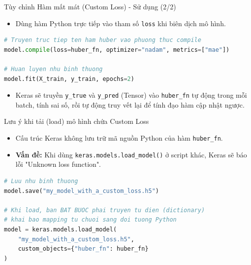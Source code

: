 \documentclass[aspectratio=169]{beamer}
\begin{document}
\begin{frame}[fragile]{Tùy chỉnh Hàm mất mát (Custom Loss) - Sử dụng (2/2)}
    \begin{itemize}
        \item Dùng hàm Python trực tiếp vào tham số \texttt{loss} khi biên dịch mô hình.
    \end{itemize}
    \begin{lstlisting}[language=Python]
# Truyen truc tiep ten ham huber vao phuong thuc compile
model.compile(loss=huber_fn, optimizer="nadam", metrics=["mae"])

# Huan luyen nhu binh thuong
model.fit(X_train, y_train, epochs=2)
    \end{lstlisting}
    \begin{itemize}
        \item Keras sẽ truyền \texttt{y\_true} và \texttt{y\_pred} (Tensor) vào \texttt{huber\_fn} tự động trong mỗi batch, tính sai số, rồi tự động truy vết lại để tính đạo hàm cập nhật ngược.
    \end{itemize}
\end{frame}

\begin{frame}[fragile]{Lưu ý khi tải (load) mô hình chứa Custom Loss}
    \begin{itemize}
        \item Cấu trúc Keras không lưu trữ mã nguồn Python của hàm \texttt{huber\_fn}.
        \item \textbf{Vấn đề:} Khi dùng \texttt{keras.models.load\_model()} ở script khác, Keras sẽ báo lỗi "Unknown loss function".
    \end{itemize}
    \begin{lstlisting}[language=Python]
# Luu nhu binh thuong
model.save("my_model_with_a_custom_loss.h5")

# Khi load, ban BAT BUOC phai truyen tu dien (dictionary) 
# khai bao mapping tu chuoi sang doi tuong Python
model = keras.models.load_model(
    "my_model_with_a_custom_loss.h5",
    custom_objects={"huber_fn": huber_fn}
)
    \end{lstlisting}
\end{frame}
\end{document}
